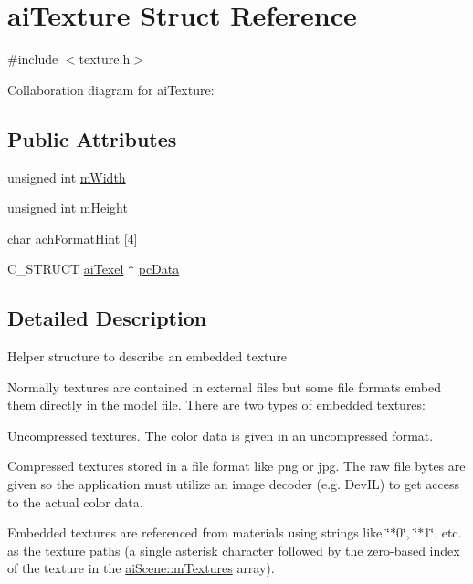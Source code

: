 \hypertarget{structai_texture}{\section{ai\-Texture Struct Reference}
\label{structai_texture}
}


{\ttfamily \#include $<$texture.\-h$>$}



Collaboration diagram for ai\-Texture\-:
\subsection*{Public Attributes}
\begin{DoxyCompactItemize}
\item 
unsigned int \hyperlink{structai_texture_aaa3ad8cfe44fdc4dea2db91977d92234}{m\-Width}
\item 
unsigned int \hyperlink{structai_texture_ac1e2fa6f1f646e9c55e3985d4418a752}{m\-Height}
\item 
char \hyperlink{structai_texture_aa9f44996acf3b301bfeb4e5348311540}{ach\-Format\-Hint} \mbox{[}4\mbox{]}
\item 
C\-\_\-\-S\-T\-R\-U\-C\-T \hyperlink{structai_texel}{ai\-Texel} $\ast$ \hyperlink{structai_texture_aeb07528748b6e49d2d81c60006024f9a}{pc\-Data}
\end{DoxyCompactItemize}


\subsection{Detailed Description}
Helper structure to describe an embedded texture

Normally textures are contained in external files but some file formats embed them directly in the model file. There are two types of embedded textures\-:
\begin{DoxyEnumerate}
\item Uncompressed textures. The color data is given in an uncompressed format.
\item Compressed textures stored in a file format like png or jpg. The raw file bytes are given so the application must utilize an image decoder (e.\-g. Dev\-I\-L) to get access to the actual color data.
\end{DoxyEnumerate}

Embedded textures are referenced from materials using strings like \char`\"{}$\ast$0\char`\"{}, \char`\"{}$\ast$1\char`\"{}, etc. as the texture paths (a single asterisk character followed by the zero-\/based index of the texture in the \hyperlink{structai_scene_a0fd0d29fbc439e3715b4975ccb68d2d3}{ai\-Scene\-::m\-Textures} array). 

